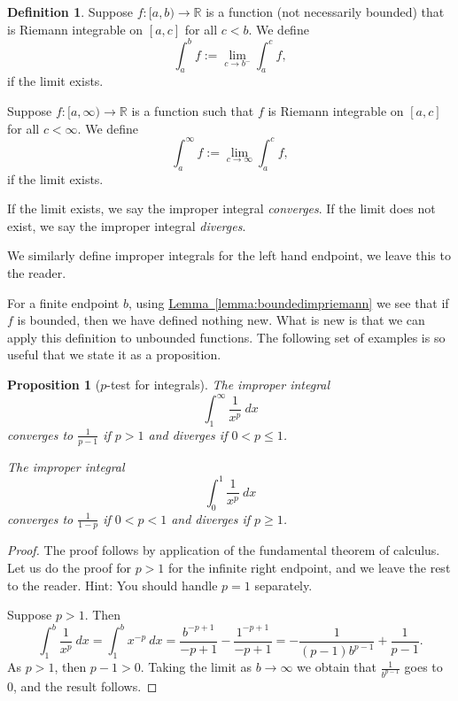\documentclass[12pt]{book}
\newcommand{\R}{{\mathbb{R}}}
\newcommand{\myindex}[1]{#1\index{#1}}
\theoremstyle{plain}
\newtheorem{prop}[thm]{Proposition}
\theoremstyle{remark}
\theoremstyle{definition}
\newtheorem{defn}[thm]{Definition}
\theoremstyle{exercise}
\theoremstyle{example}
\newcommand{\lemmaref}[1]{\hyperref[#1]{Lemma~\ref*{#1}}}
\begin{document}
\begin{defn}
Suppose $f \colon [a,b) \to \R$ is a function (not necessarily bounded)
that is Riemann integrable on $[a,c]$ for all $c < b$.  We define
\begin{equation*}
\int_a^b f := \lim_{c \to b^-} \int_a^{c} f ,
\end{equation*}
if the limit exists.%

Suppose $f \colon [a,\infty) \to \R$ is a function such that
$f$ is Riemann integrable on $[a,c]$ for all $c < \infty$.  
We define
\begin{equation*}
\int_a^\infty f := \lim_{c \to \infty} \int_a^c f ,
\end{equation*}
if the limit exists.

If the limit exists, we say the improper integral
\emph{\myindex{converges}}.
If the limit does not exist, we say the improper integral
\emph{\myindex{diverges}}.

We similarly define improper integrals for the left hand endpoint, we leave
this to the reader.
\end{defn}

For a finite endpoint $b$,
using \lemmaref{lemma:boundedimpriemann} we see that if
$f$ is bounded, then we have defined nothing new.  What is new is that
we can apply this definition to unbounded functions.
The following set of examples is
so useful that we state it as a proposition.

\begin{prop}[$p$-test for integrals]
\label{impropriemann:ptest}
The improper integral
\begin{equation*}
\int_1^\infty \frac{1}{x^p} ~dx
\end{equation*}
converges to $\frac{1}{p-1}$ if $p > 1$ and diverges if $0 < p \leq 1$.

The improper integral
\begin{equation*}
\int_0^1 \frac{1}{x^p} ~dx
\end{equation*}
converges to $\frac{1}{1-p}$ if $0 < p < 1$ and diverges if $p \geq 1$.
\end{prop}

\begin{proof}
The proof follows by application of the fundamental theorem of calculus.
Let us do the proof for $p > 1$ for the infinite right endpoint, and
we leave the rest to the reader.  Hint: You should handle $p=1$
separately.

Suppose $p > 1$.  Then
\begin{equation*}
\int_1^b \frac{1}{x^p} ~dx
=
\int_1^b x^{-p} ~dx
=
\frac{b^{-p+1}}{-p+1}
-
\frac{1^{-p+1}}{-p+1}
=
-
\frac{1}{(p-1)b^{p-1}}
+
\frac{1}{p-1} .
\end{equation*}
As $p > 1$, then $p-1 > 0$.  Taking the limit as $b \to \infty$
we obtain that $\frac{1}{b^{p-1}}$ goes to 0, and the result follows.
\end{proof}
\end{document}
